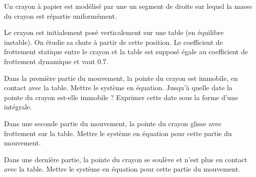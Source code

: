 

Un crayon à papier est modélisé par une un segment de droite sur lequel la masse du crayon est répartie uniformément.

Le crayon est initialement posé verticalement sur une table (en équilibre instable). On étudie sa chute à partir de cette position. Le coefficient de frottement statique entre le crayon et la table est supposé égale au coefficient de frottement dynamique et vaut \SI{0.7}{}.

\question Dans la première partie du mouvement, la pointe du crayon est immobile, en contact avec la table.
\subquestion Mettre le système en équation.
\subquestion Jusqu'à quelle date la pointe du crayon est-elle immobile ? Exprimer cette date sous la forme d'une intégrale.

\question Dans une seconde partie du mouvement, la pointe du crayon glisse avec frottement sur la table. Mettre le système en équation pour cette partie du mouvement.

\question Dans une dernière partie, la pointe du crayon se soulève et n'est plus en contact avec la table. Mettre le système en équation pour cette partie du mouvement.

